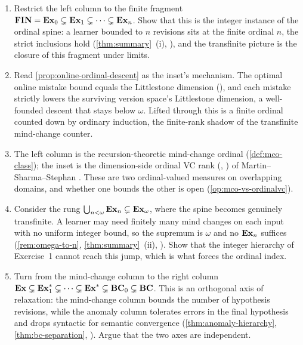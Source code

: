 \begin{enumerate}[leftmargin=*,itemsep=3pt]
\item Restrict the left column to the finite fragment $\mathbf{FIN} = \mathbf{Ex}_0 \subsetneq \mathbf{Ex}_1 \subsetneq \cdots \subsetneq \mathbf{Ex}_n$. Show that this is the integer instance of the ordinal spine: a learner bounded to $n$ revisions sits at the finite ordinal $n$, the strict inclusions hold (\cref{thm:summary}~(i), \cite{Velauthapillai1989}), and the transfinite picture is the closure of this fragment under limits.

\item Read \cref{prop:online-ordinal-descent} as the inset's mechanism. The optimal online mistake bound equals the Littlestone dimension (), and each mistake strictly lowers the surviving version space's Littlestone dimension, a well-founded descent that stays below $\omega$. Lifted through  this is a finite ordinal counted down by ordinary induction, the finite-rank shadow of the transfinite mind-change counter.

\item The left column is the recursion-theoretic mind-change ordinal (\cref{def:mco-class}); the inset is the dimension-side ordinal VC rank (, ) of Martin--Sharma--Stephan \cite{MartinSharmaStephan2006}. These are two ordinal-valued measures on overlapping domains, and whether one bounds the other is open (\cref{op:mco-vs-ordinalvc}).

\item Consider the rung $\bigcup_{n<\omega}\mathbf{Ex}_n \subsetneq \mathbf{Ex}_\omega$, where the spine becomes genuinely transfinite. A learner may need finitely many mind changes on each input with no uniform integer bound, so the supremum is $\omega$ and no $\mathbf{Ex}_n$ suffices (\cref{rem:omega-to-n}, \cref{thm:summary}~(ii), \cite{FreivaldsSmith1993}). Show that the integer hierarchy of Exercise~1 cannot reach this jump, which is what forces the ordinal index.

\item Turn from the mind-change column to the right column $\mathbf{Ex} \subsetneq \mathbf{Ex}_1^* \subsetneq \cdots \subsetneq \mathbf{Ex}^* \subsetneq \mathbf{BC}_0 \subsetneq \mathbf{BC}$. This is an orthogonal axis of relaxation: the mind-change column bounds the number of hypothesis revisions, while the anomaly column tolerates errors in the final hypothesis and drops syntactic for semantic convergence (\cref{thm:anomaly-hierarchy}, \cref{thm:bc-separation}, \cite{CaseSmith1983}). Argue that the two axes are independent.


\end{enumerate}
